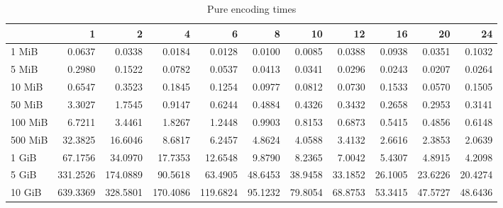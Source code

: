 \begin{table}[!h]
	\caption{Pure encoding times}
	\begin{tabular}{lrrrrrrrrrr}
		\toprule
		\diagbox{File sizes }{Threads}  &        1  &        2  &        4  &        6  &       8  &       10 &       12 &       16 &       20 &       24 \\
		\midrule
		1 MiB   &    0.0637 &    0.0338 &    0.0184 &    0.0128 &   0.0100 &   0.0085 &   0.0388 &   0.0938 &   0.0351 &   0.1032 \\
		5 MiB   &    0.2980 &    0.1522 &    0.0782 &    0.0537 &   0.0413 &   0.0341 &   0.0296 &   0.0243 &   0.0207 &   0.0264 \\
		10 MiB  &    0.6547 &    0.3523 &    0.1845 &    0.1254 &   0.0977 &   0.0812 &   0.0730 &   0.1533 &   0.0570 &   0.1505 \\
		50 MiB  &    3.3027 &    1.7545 &    0.9147 &    0.6244 &   0.4884 &   0.4326 &   0.3432 &   0.2658 &   0.2953 &   0.3141 \\
		100 MiB &    6.7211 &    3.4461 &    1.8267 &    1.2448 &   0.9903 &   0.8153 &   0.6873 &   0.5415 &   0.4856 &   0.6148 \\
		500 MiB &   32.3825 &   16.6046 &    8.6817 &    6.2457 &   4.8624 &   4.0588 &   3.4132 &   2.6616 &   2.3853 &   2.0639 \\
		1 GiB   &   67.1756 &   34.0970 &   17.7353 &   12.6548 &   9.8790 &   8.2365 &   7.0042 &   5.4307 &   4.8915 &   4.2098 \\
		5 GiB   &  331.2526 &  174.0889 &   90.5618 &   63.4905 &  48.6453 &  38.9458 &  33.1852 &  26.1005 &  23.6226 &  20.4274 \\
		10 GiB  &  639.3369 &  328.5801 &  170.4086 &  119.6824 &  95.1232 &  79.8054 &  68.8753 &  53.3415 &  47.5727 &  48.6436 \\
		\bottomrule
	\end{tabular}
\end{table}
